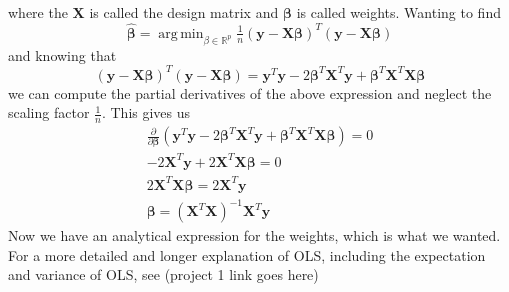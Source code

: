 \documentclass{article}
\theoremstyle{definition}
\DeclareMathOperator*{\argmin}{arg\,min}
\begin{document}
where the $\mathbf{X}$ is called the design matrix and $\bm{\beta}$ is called weights. Wanting to find
\begin{equation*}
    \bm{\hat{\beta}} = \argmin_{\beta \in \mathbb{R}^p}\tfrac{1}{n}(\mathbf{y} - \mathbf{X}\bm{\beta})^T(\mathbf{y} - \mathbf{X}\bm{\beta})
\end{equation*}
and knowing that
\begin{equation*}
    (\mathbf{y} - \mathbf{X}\bm{\beta})^T(\mathbf{y} - \mathbf{X}\bm{\beta}) = \mathbf{y}^T\mathbf{y} - 2\bm{\beta}^T\mathbf{X}^T\mathbf{y} + \bm{\beta}^T\mathbf{X}^T\mathbf{X}\bm{\beta}
\end{equation*}
we can compute the partial derivatives of the above expression and neglect the scaling factor $\tfrac{1}{n}$. This gives us
\begin{gather*}
    \frac{\partial}{\partial \boldsymbol{\beta}} \left( \boldsymbol{y}^T \boldsymbol{y} - 2 \boldsymbol{\beta}^T \textbf{X}^T \boldsymbol{y} + \boldsymbol{\beta}^T \textbf{X}^T \textbf{X} \boldsymbol{\beta} \right) = 0 \\
    -2 \textbf{X}^T \boldsymbol{y} + 2 \textbf{X}^T \boldsymbol{X \beta} = 0 \\
    2 \textbf{X}^T \boldsymbol{X \beta} = 2 \textbf{X}^T \boldsymbol{y} \\
    \boldsymbol{\beta} = \left( \textbf{X}^T \textbf{X} \right)^{-1} \textbf{X}^T \boldsymbol{y}
\end{gather*}
Now we have an analytical expression for the weights, which is what we wanted.
For a more detailed and longer explanation of OLS, including the expectation and variance of OLS, see (project 1 link goes here)
\end{document}
